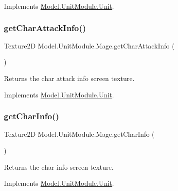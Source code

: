 Implements \hyperlink{interface_model_1_1_unit_module_1_1_unit_a6e9528d09bca7702fe99cc95135ede36}{Model.\+Unit\+Module.\+Unit}.

\hypertarget{class_model_1_1_unit_module_1_1_mage_a69d22e6d54e3f0d7f3cf8b1029755ffe}{}\label{class_model_1_1_unit_module_1_1_mage_a69d22e6d54e3f0d7f3cf8b1029755ffe} 
\subsubsection{\texorpdfstring{get\+Char\+Attack\+Info()}{getCharAttackInfo()}}
{\footnotesize\ttfamily Texture2D Model.\+Unit\+Module.\+Mage.\+get\+Char\+Attack\+Info (\begin{DoxyParamCaption}{ }\end{DoxyParamCaption})\hspace{0.3cm}{\ttfamily [inline]}}

Returns the char attack info screen texture. 

Implements \hyperlink{interface_model_1_1_unit_module_1_1_unit_a7c89d9a1dc648b556b7e57cdcdbf2930}{Model.\+Unit\+Module.\+Unit}.

\hypertarget{class_model_1_1_unit_module_1_1_mage_a6c9b2e9f98ed461b77559c1241407c94}{}\label{class_model_1_1_unit_module_1_1_mage_a6c9b2e9f98ed461b77559c1241407c94} 
\subsubsection{\texorpdfstring{get\+Char\+Info()}{getCharInfo()}}
{\footnotesize\ttfamily Texture2D Model.\+Unit\+Module.\+Mage.\+get\+Char\+Info (\begin{DoxyParamCaption}{ }\end{DoxyParamCaption})\hspace{0.3cm}{\ttfamily [inline]}}

Returns the char info screen texture. 

Implements \hyperlink{interface_model_1_1_unit_module_1_1_unit_a4e2aeae552d85c8938e609729bcd1a44}{Model.\+Unit\+Module.\+Unit}.

